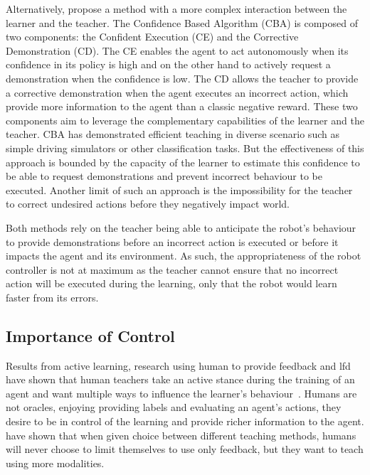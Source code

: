 Alternatively, \cite{chernova2009interactive} propose a method with a more complex interaction between the learner and the teacher. The Confidence Based Algorithm (CBA) is composed of two components: the Confident Execution (CE) and the Corrective Demonstration (CD). The CE enables the agent to act autonomously when its confidence in its policy is high and on the other hand to actively request a demonstration when the confidence is low. The CD allows the teacher to provide a corrective demonstration when the agent executes an incorrect action, which provide more information to the agent than a classic negative reward. These two components aim to leverage the complementary capabilities of the learner and the teacher. CBA has demonstrated efficient teaching in diverse scenario such as simple driving simulators or other classification tasks. But the effectiveness of this approach is bounded by the capacity of the learner to estimate this confidence to be able to request demonstrations and prevent incorrect behaviour to be executed. Another limit of such an approach is the impossibility for the teacher to correct undesired actions before they negatively impact world. 

Both methods rely on the teacher being able to anticipate the robot's behaviour to provide demonstrations before an incorrect action is executed or before it impacts the agent and its environment. As such, the appropriateness of the robot controller is not at maximum as the teacher cannot ensure that no incorrect action will be executed during the learning, only that the robot would learn faster from its errors.

\subsection{Importance of Control}

Results from active learning, research using human to provide feedback and \gls{lfd} have shown that human teachers take an active stance during the training of an agent and want multiple ways to influence the learner's behaviour~\citep{amershi2014power}. Humans are not oracles, enjoying providing labels and evaluating an agent's actions, they desire to be in control of the learning and provide richer information to the agent. \cite{kaochar2011towards} have shown that when given choice between different teaching methods, humans will never choose to limit themselves to use only feedback, but they want to teach using more modalities.

